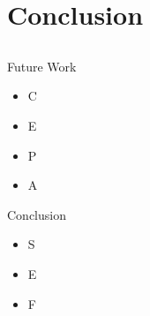 \documentclass[handout]{beamer}
\begin{document}
\section{Conclusion}
\subsection{}
\begin{frame}{Future Work}
\begin{itemize}[<+->]
	\item C
	\item E
	\item P
	\item A
\end{itemize}
\end{frame}


\begin{frame}{Conclusion}
\begin{itemize}[<+->]
	\item S
	\item E
	\item F
\end{itemize}

\end{frame}
\end{document}
